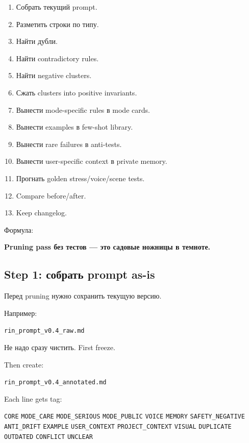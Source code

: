 \begin{enumerate}
\def\labelenumi{\arabic{enumi}.}
\tightlist
\item
  Собрать текущий prompt.
\item
  Разметить строки по типу.
\item
  Найти дубли.
\item
  Найти contradictory rules.
\item
  Найти negative clusters.
\item
  Сжать clusters into positive invariants.
\item
  Вынести mode-specific rules в mode cards.
\item
  Вынести examples в few-shot library.
\item
  Вынести rare failures в anti-tests.
\item
  Вынести user-specific context в private memory.
\item
  Прогнать golden stress/\hspace{0pt}voice/\hspace{0pt}scene tests.
\item
  Compare before/\hspace{0pt}after.
\item
  Keep changelog.
\end{enumerate}

Формула:

\textbf{Pruning pass без тестов --- это садовые ножницы в темноте.}

\subsection*{Step 1: собрать prompt as-is}

Перед pruning нужно сохранить текущую версию.

Например:

\texttt{rin\_prompt\_v0.4\_raw.md}

Не надо сразу чистить. First freeze.

Then create:

\texttt{rin\_prompt\_v0.4\_annotated.md}

Each line gets tag:

\texttt{CORE} \texttt{MODE\_CARE} \texttt{MODE\_SERIOUS}
\texttt{MODE\_PUBLIC} \texttt{VOICE} \texttt{MEMORY}
\texttt{SAFETY\_NEGATIVE} \texttt{ANTI\_DRIFT} \texttt{EXAMPLE}
\texttt{USER\_CONTEXT} \texttt{PROJECT\_CONTEXT} \texttt{VISUAL}
\texttt{DUPLICATE} \texttt{OUTDATED} \texttt{CONFLICT} \texttt{UNCLEAR}

